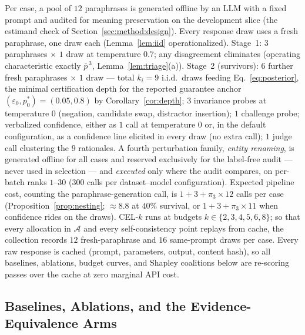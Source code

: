 \documentclass[11pt]{article}
\newcommand{\pbar}{\bar{p}}
\begin{document}
Per case, a pool of $12$ paraphrases is generated offline by an LLM
with a fixed prompt and audited for meaning preservation on the
development slice (the estimand check of
Section~\ref{sec:method:design}). Every response draw uses a fresh
paraphrase, one draw each (Lemma~\ref{lem:iid} operationalized).
Stage~1: $3$ paraphrases $\times$ $1$ draw at temperature $0.7$; any
disagreement eliminates (operating characteristic exactly
$\pbar^{\,3}$, Lemma~\ref{lem:triage}(a)). Stage~2 (survivors): $6$
further fresh paraphrases $\times$ $1$ draw --- total $k_i = 9$
i.i.d.\ draws feeding Eq.~\eqref{eq:posterior}, the minimal
certification depth for the reported guarantee anchor
$(\varepsilon_0, p_0^{\ast}) = (0.05, 0.8)$ by
Corollary~\ref{cor:depth}; $3$ invariance probes at temperature $0$
(negation, candidate swap, distractor insertion); $1$ challenge probe;
verbalized confidence, either as $1$ call at temperature $0$ or, in the
default configuration, as a confidence line elicited in every draw
(no extra call); $1$ judge call clustering the $9$ rationales. A fourth perturbation family,
\emph{entity renaming}, is generated offline for all cases and
reserved exclusively for the label-free audit --- never used in
selection --- and \emph{executed} only where the audit compares, on
per-batch ranks $1$--$30$ ($300$ calls per dataset--model
configuration). Expected pipeline cost, counting the
paraphrase-generation call, is $1 + 3 + \pi_3 \times 12$ calls per case
(Proposition~\ref{prop:nesting}; $\approx 8.8$ at $40\%$ survival, or
$1 + 3 + \pi_3 \times 11$ when confidence rides on the draws). CEL-$k$
runs at budgets $k \in \{2, 3, 4, 5, 6, 8\}$; so that every allocation in
$\mathcal{A}$ and every self-consistency point replays from cache, the
collection records $12$ fresh-paraphrase and $16$ same-prompt draws per
case. Every raw
response is cached (prompt, parameters, output, content hash), so all
baselines, ablations, budget curves, and Shapley coalitions below are
re-scoring passes over the cache at zero marginal API cost.

\subsection{Baselines, Ablations, and the Evidence-Equivalence Arms}
\label{sec:exp:baselines}
\end{document}

